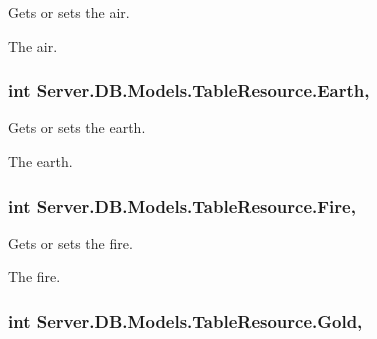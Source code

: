 Gets or sets the air. 

The air.\hypertarget{classServer_1_1DB_1_1Models_1_1TableResource_ae2ff1b6042266fb90faf61be360032f0}{}
\subsubsection[{Earth}]{\setlength{\rightskip}{0pt plus 5cm}int Server.\+D\+B.\+Models.\+Table\+Resource.\+Earth\hspace{0.3cm}{\ttfamily [get]}, {\ttfamily [set]}}\label{classServer_1_1DB_1_1Models_1_1TableResource_ae2ff1b6042266fb90faf61be360032f0}


Gets or sets the earth. 

The earth.\hypertarget{classServer_1_1DB_1_1Models_1_1TableResource_a0d1e91686bac391d4ff09c6a134d5d5c}{}
\subsubsection[{Fire}]{\setlength{\rightskip}{0pt plus 5cm}int Server.\+D\+B.\+Models.\+Table\+Resource.\+Fire\hspace{0.3cm}{\ttfamily [get]}, {\ttfamily [set]}}\label{classServer_1_1DB_1_1Models_1_1TableResource_a0d1e91686bac391d4ff09c6a134d5d5c}


Gets or sets the fire. 

The fire.\hypertarget{classServer_1_1DB_1_1Models_1_1TableResource_a8dd4232349224d6f9b3d6b7050fa8af4}{}
\subsubsection[{Gold}]{\setlength{\rightskip}{0pt plus 5cm}int Server.\+D\+B.\+Models.\+Table\+Resource.\+Gold\hspace{0.3cm}{\ttfamily [get]}, {\ttfamily [set]}}\label{classServer_1_1DB_1_1Models_1_1TableResource_a8dd4232349224d6f9b3d6b7050fa8af4}


